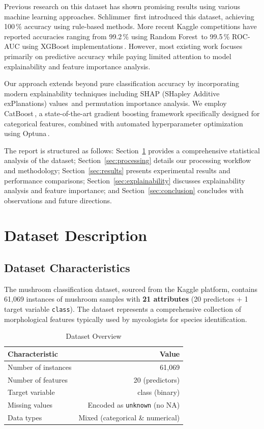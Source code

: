 \documentclass[11pt,a4paper]{article}
\begin{document}
Previous research on this dataset has shown promising results using various machine learning approaches. Schlimmer\,\cite{schlimmer1987concept} first introduced this dataset, achieving 100\,\% accuracy using rule-based methods. More recent Kaggle competitions have reported accuracies ranging from 99.2\,\% using Random Forest\,\cite{kaggle2019mushroom,breiman2001random} to 99.5\,\% ROC-AUC using XGBoost implementations\,\cite{chen2016xgboost}. However, most existing work focuses primarily on predictive accuracy while paying limited attention to model explainability and feature importance analysis.

Our approach extends beyond pure classification accuracy by incorporating modern explainability techniques including SHAP (SHapley Additive exPlanations) values\,\cite{lundberg2017shap} and permutation importance analysis. We employ CatBoost\,\cite{prokhorenkova2018catboost}, a state-of-the-art gradient boosting framework specifically designed for categorical features, combined with automated hyperparameter optimization using Optuna\,\cite{akiba2019optuna}.

The report is structured as follows: Section~\ref{sec:dataset} provides a comprehensive statistical analysis of the dataset; Section~\ref{sec:processing} details our processing workflow and methodology; Section~\ref{sec:results} presents experimental results and performance comparisons; Section~\ref{sec:explainability} discusses explainability analysis and feature importance; and Section~\ref{sec:conclusion} concludes with observations and future directions.

\section{Dataset Description}
\label{sec:dataset}

\subsection{Dataset Characteristics}

The mushroom classification dataset, sourced from the Kaggle platform, contains 61,069 instances of mushroom samples with \textbf{21 attributes} (20 predictors + 1 target variable \texttt{class}). The dataset represents a comprehensive collection of morphological features typically used by mycologists for species identification.

\begin{table}[H]
\centering
\caption{Dataset Overview}
\begin{tabular}{@{}lr@{}}
\toprule
\textbf{Characteristic} & \textbf{Value} \\
\midrule
Number of instances & 61,069 \\
Number of features & 20 (predictors) \\
Target variable & class (binary) \\
Missing values & Encoded as \texttt{unknown} (no NA) \\
Data types & Mixed (categorical \& numerical) \\
\bottomrule
\end{tabular}
\end{table}
\end{document}
